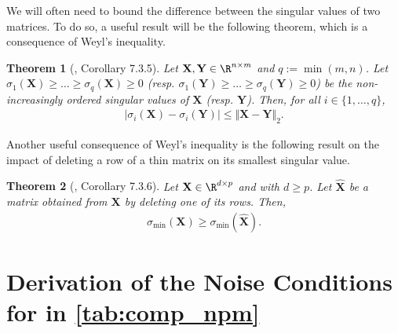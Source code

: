 \documentclass{article}
\theoremstyle{plain}
\newtheorem{theorem}{Theorem}[section]
\theoremstyle{definition}
\theoremstyle{remark}
\begin{document}
We will often need to bound the difference between the singular values of two matrices. To do so, a useful result will be the following theorem, which is a consequence of Weyl's inequality.

\begin{theorem}[\citet{horn85}, Corollary 7.3.5]\label{th:weyl}
    Let $\mathbf{X}, \mathbf{Y} \in \R^{n\times m}$ and $q:= \min(m,n)$. Let $\sigma_1(\mathbf{X}) \geqslant \dots \geqslant \sigma_q(\mathbf{X}) \geqslant 0$ (resp. $\sigma_1(\mathbf{Y}) \geqslant \dots \geqslant \sigma_q(\mathbf{Y}) \geqslant 0$) be the non-increasingly ordered singular values of $\mathbf{X}$ (resp. $\mathbf{Y}$). Then, for all $i\in \{1,\dots,q\}$,
    \begin{align*}
        \vert\sigma_i(\mathbf{X}) - \sigma_i(\mathbf{Y})\vert \leqslant \Vert \mathbf{X} - \mathbf{Y}\Vert_2.
    \end{align*}
\end{theorem}

Another useful consequence of Weyl's inequality is the following result on the impact of deleting a row of a thin matrix on its smallest singular value.

\begin{theorem}[\citet{horn85}, Corollary 7.3.6]\label{th:sv_delete}
    Let $\mathbf{X}\in \R^{d\times p}$ and with $d\geqslant p$. Let $\hat{\mathbf{X}}$ be a matrix obtained from $\mathbf{X}$ by deleting one of its rows. Then,
    \begin{align*}
        \sigma_{\min} (\mathbf{X}) \geqslant \sigma_{\min} (\hat{\mathbf{X}}).
    \end{align*}
\end{theorem}




\section{Derivation of the Noise Conditions for \cite{xu2023anpm} in \cref{tab:comp_npm}}\label{appdx:xunoisecond}
\end{document}
